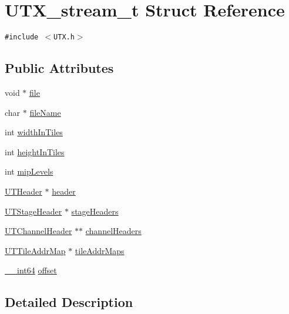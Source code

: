 \hypertarget{struct_u_t_x__stream__t}{
\section{UTX\_\-stream\_\-t Struct Reference}
\label{struct_u_t_x__stream__t}
}
{\tt \#include $<$UTX.h$>$}

\subsection*{Public Attributes}
\begin{CompactItemize}
\item 
void $\ast$ \hyperlink{struct_u_t_x__stream__t_6538f0cf9da002661cfb309f52cbbfc9}{file}
\item 
char $\ast$ \hyperlink{struct_u_t_x__stream__t_31de26d2f8e389e4cd650f9ce503ff53}{fileName}
\item 
int \hyperlink{struct_u_t_x__stream__t_cb6233f004f9bb35c5ad003e20fa5ef1}{widthInTiles}
\item 
int \hyperlink{struct_u_t_x__stream__t_47d53e19719ffa239810e1b50eede36a}{heightInTiles}
\item 
int \hyperlink{struct_u_t_x__stream__t_f18124ad6493ddd0301ec2f10075e3ef}{mipLevels}
\item 
\hyperlink{struct_u_t_header}{UTHeader} $\ast$ \hyperlink{struct_u_t_x__stream__t_f85ef52373629cd65ea52d928fab8341}{header}
\item 
\hyperlink{struct_u_t_stage_header}{UTStageHeader} $\ast$ \hyperlink{struct_u_t_x__stream__t_4133cbb5face496735b8133aa580806c}{stageHeaders}
\item 
\hyperlink{struct_u_t_channel_header}{UTChannelHeader} $\ast$$\ast$ \hyperlink{struct_u_t_x__stream__t_314a808eb2ae10a7d6b27dfe2ad3705d}{channelHeaders}
\item 
\hyperlink{struct_u_t_tile_addr_map}{UTTileAddrMap} $\ast$ \hyperlink{struct_u_t_x__stream__t_0c0ce07983b8865fdde4e694261caa3e}{tileAddrMaps}
\item 
\hyperlink{common__afx_8h_2e015c96ada30f1fdb9322f7af889c10}{\_\-\_\-int64} \hyperlink{struct_u_t_x__stream__t_8d542232a515837bd595f28f5a5fd062}{offset}
\end{CompactItemize}


\subsection{Detailed Description}


